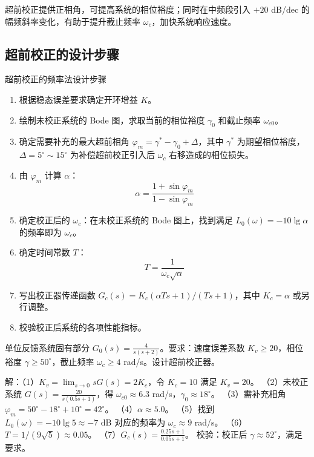 \begin{remark}
超前校正提供正相角，可提高系统的相位裕度；同时在中频段引入 $+20$ dB/dec 的幅频斜率变化，有助于提升截止频率 $\omega_c$，加快系统响应速度。
\end{remark}

\subsection{超前校正的设计步骤}

\begin{myalgorithm}{超前校正的频率法设计步骤}
\begin{enumerate}
    \item 根据稳态误差要求确定开环增益 $K$。
    \item 绘制未校正系统的 Bode 图，求取当前的相位裕度 $\gamma_0$ 和截止频率 $\omega_{c0}$。
    \item 确定需要补充的最大超前相角 $\varphi_m = \gamma^* - \gamma_0 + \Delta$，其中 $\gamma^*$ 为期望相位裕度，$\Delta = 5^{\circ}\sim 15^{\circ}$ 为补偿超前校正引入后 $\omega_c$ 右移造成的相位损失。
    \item 由 $\varphi_m$ 计算 $\alpha$：
    \[
    \alpha = \frac{1 + \sin\varphi_m}{1 - \sin\varphi_m}
    \]
    \item 确定校正后的 $\omega_c$：在未校正系统的 Bode 图上，找到满足 $L_0(\omega) = -10\lg\alpha$ 的频率即为 $\omega_c$。
    \item 确定时间常数 $T$：
    \[
    T = \frac{1}{\omega_c\sqrt{\alpha}}
    \]
    \item 写出校正器传递函数 $G_c(s) = K_c(\alpha Ts + 1)/(Ts + 1)$，其中 $K_c = \alpha$ 或另行调整。
    \item 校验校正后系统的各项性能指标。
\end{enumerate}
\end{myalgorithm}

\begin{example}
单位反馈系统固有部分 $G_0(s) = \frac{4}{s(s+2)}$。要求：速度误差系数 $K_v \geq 20$，相位裕度 $\gamma \geq 50^{\circ}$，截止频率 $\omega_c \geq 4$ rad/s。设计超前校正器。

解：（1）$K_v = \lim_{s\to 0}sG(s) = 2K_c$，令 $K_c=10$ 满足 $K_v=20$。
（2）未校正系统 $G(s) = \frac{20}{s(0.5s+1)}$，得 $\omega_{c0} \approx 6.3$ rad/s，$\gamma_0 \approx 18^{\circ}$。
（3）需补充相角 $\varphi_m = 50^{\circ} - 18^{\circ} + 10^{\circ} = 42^{\circ}$。
（4）$\alpha \approx 5.0$。
（5）找到 $L_0(\omega) = -10\lg 5 \approx -7$ dB 对应的频率为 $\omega_c \approx 9$ rad/s。
（6）$T = 1/(9\sqrt{5}) \approx 0.05$。
（7）$G_c(s) = \frac{0.25s+1}{0.05s+1}$。
校验：校正后 $\gamma \approx 52^{\circ}$，满足要求。
\end{example}

